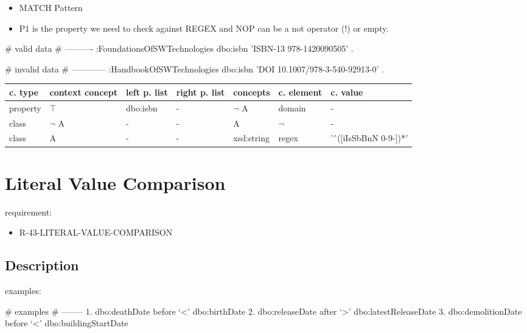 \documentclass{llncs}
\newenvironment{gcotable}{
  \scriptsize
  \sffamily
  \vspace{0.3cm}
  \begin{tabular}{l|l|l|l|l|l|l}
  \hline
  \textbf{c. type} & \textbf{context concept} & \textbf{left p. list} & \textbf{right p. list} & \textbf{concepts} & \textbf{c. element} & \textbf{c. value} \\
  \hline

}{
  \hline
  \end{tabular}
  \linebreak
}
\begin{document}

\begin{itemize}
	\item MATCH Pattern \cite{Kontokostas2014} 
  \item P1 is the property we need to check against REGEX and
NOP can be a not operator (!) or empty.
\end{itemize}

\begin{ex}
# valid data
# ----------
:FoundationsOfSWTechnologies
    dbo:isbn 'ISBN-13 978-1420090505' .
\end{ex}

\begin{ex}
# invalid data
# ------------
:HandbookOfSWTechnologies
    dbo:isbn 'DOI 10.1007/978-3-540-92913-0' .
\end{ex}

\begin{gcotable}
property & $\top$ & dbo:isbn & - & $\neg$ A & domain & - \\
class & $\neg$ A & - & - & A & $\neg$ & - \\
class & A & - & - & xsd:string & regex & 'ˆ([iIsSbBnN 0-9-])*$' $ \\
\end{gcotable}

\section{Literal Value Comparison}

requirement:

\begin{itemize}
	\item R-43-LITERAL-VALUE-COMPARISON
\end{itemize}

\subsection{Description}

examples:

\begin{ex}
# examples
# --------
1. dbo:deathDate before ‘<’ dbo:birthDate
2. dbo:releaseDate after ‘>’ dbo:latestReleaseDate
3. dbo:demolitionDate before ‘<’ dbo:buildingStartDate
\end{ex}
\end{document}
